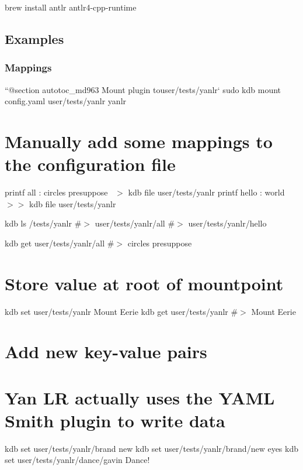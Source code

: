 \begin{DoxyCode}
brew install antlr antlr4-cpp-runtime
\end{DoxyCode}
\hypertarget{autotoc_md955_autotoc_md961}{}\subsection{Examples}\label{autotoc_md955_autotoc_md961}
\hypertarget{autotoc_md955_autotoc_md962}{}\subsubsection{Mappings}\label{autotoc_md955_autotoc_md962}
``{\ttfamily  @section autotoc\+\_\+md963 Mount plugin to}user/tests/yanlr` sudo kdb mount config.\+yaml user/tests/yanlr yanlr\hypertarget{autotoc_md955_autotoc_md964}{}\section{Manually add some mappings to the configuration file}\label{autotoc_md955_autotoc_md964}
printf \textquotesingle{}all \+: circles presuppose~\newline
\textquotesingle{} $>$ {\ttfamily kdb file user/tests/yanlr} printf \textquotesingle{}hello \+: world~\newline
\textquotesingle{} $>$$>$ {\ttfamily kdb file user/tests/yanlr}

kdb ls /tests/yanlr \#$>$ user/tests/yanlr/all \#$>$ user/tests/yanlr/hello

kdb get user/tests/yanlr/all \#$>$ circles presuppose\hypertarget{autotoc_md955_autotoc_md965}{}\section{Store value at root of mountpoint}\label{autotoc_md955_autotoc_md965}
kdb set user/tests/yanlr \textquotesingle{}Mount Eerie\textquotesingle{} kdb get user/tests/yanlr \#$>$ Mount Eerie\hypertarget{autotoc_md955_autotoc_md966}{}\section{Add new key-\/value pairs}\label{autotoc_md955_autotoc_md966}
\hypertarget{autotoc_md955_autotoc_md967}{}\section{Yan L\+R actually uses the Y\+A\+M\+L Smith plugin to write data}\label{autotoc_md955_autotoc_md967}
kdb set user/tests/yanlr/brand new kdb set user/tests/yanlr/brand/new eyes kdb set user/tests/yanlr/dance/gavin \textquotesingle{}Dance!\textquotesingle{}

